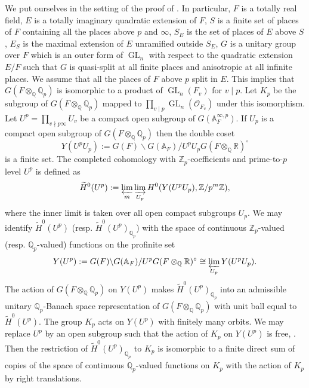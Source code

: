 \documentclass{amsart}
\theoremstyle{definition}
\theoremstyle{remark}
\DeclareMathOperator{\GL}{GL}
\newcommand{\Qp}{\mathbb {Q}_p}
\newcommand{\Zp}{\ZZ_p}
\newcommand{\ZZ}{\mathbb Z}
\newcommand{\QQ}{\mathbb Q}
\newcommand{\RR}{\mathbb R}
\newcommand{\OO}{\mathcal O}
\newcommand{\Htilde}{\widetilde{H}^0}
\begin{document}
 We put ourselves in the setting of the proof of  \cite[Theorem 3.3.3]{FS}. In particular,  $F$ is a totally real field, $E$ is a totally imaginary quadratic extension of $F$,  
 $S$ is a finite set of places of $F$ containing all the places above $p$ and $\infty$, $S_E$ is the set of places of $E$ above $S$,  $E_S$ is the maximal extension of $E$ unramified outside $S_E$,
   $G$ is a unitary group over $F$ which is an outer form of $\GL_n$ with respect to the quadratic extension $E/F$ such that $G$ is quasi-split at all finite places and anisotropic at all infinite places. We assume that all the places of $F$ above $p$ split in $E$. This implies that $G(F\otimes_{\QQ} \Qp)$ 
is isomorphic to a product of $\GL_n(F_v)$ for $v\mid p$. Let $K_p$ be 
the subgroup of $G(F\otimes_{\QQ} \Qp)$ mapped to $\prod_{v\mid p} \GL_n(\OO_{F_v})$ under this isomorphism. 
Let $U^p=\prod_{v\nmid p\infty} U_v$ be a compact  open subgroup of $G(\mathbb A^{\infty, p}_F)$. If $U_p$ is a compact open subgroup  of $G(F\otimes_{\QQ} \Qp)$ then the double coset 
  $$Y(U^p U_p):= G(F)\backslash G(\mathbb A_F)/ U^p U_p G(F \otimes_{\QQ} \RR)^{\circ}$$
is a finite set. The  completed cohomology with $\Zp$-coefficients and prime-to-$p$ level $U^p$ is defined as
$$ \Htilde(U^p):= \varprojlim_{m} \varinjlim_{U_p} H^0(Y(U^p U_p), \ZZ/p^m \ZZ),$$
where the inner limit is taken over all open compact subgroups $U_p$. We may identify  $\Htilde(U^p)$ (resp. $\Htilde(U^p)_{\Qp}$)  with the space of continuous $\Zp$-valued (resp. $\Qp$-valued) functions on the profinite set $$Y(U^p):=G(F)\backslash G(\mathbb A_F)/ U^p  G(F \otimes_{\QQ} \RR)^{\circ}\cong\varprojlim_{U_p} Y(U^p U_p).$$
 The action of $G(F\otimes_{\QQ} \Qp)$ on $Y(U^p)$ makes $\Htilde(U^p)_{\Qp}$ into an admissible unitary 
$\Qp$-Banach space representation of $G(F\otimes_{\QQ} \Qp)$ with unit ball equal to $\Htilde(U^p)$. The group $K_p$ acts on $Y(U^p)$ with finitely many orbits. We may replace $U^p$ by an open subgroup such that the action of $K_p$ on $Y(U^p)$ is free, \cite[Remark 9.3]{DPS}. Then the restriction of $\Htilde(U^p)_{\Qp}$
to $K_p$ is isomorphic to a finite direct sum of copies of the space of 
continuous $\Qp$-valued functions on $K_p$ with the action of $K_p$ by right translations.
\end{document}

